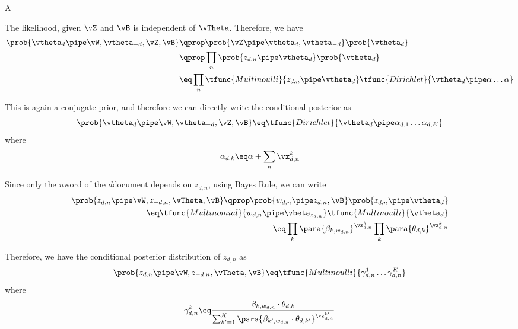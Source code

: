 \documentclass{article}
\begin{document}
\begin{question}
\begin{qpart}{A}
\begin{enumerate}
				The likelihood, given $\vZ$ and $\vB$ is independent of $\vTheta$. Therefore, we have
				\begin{align*}
					\prob{\vtheta_d \pipe \vW, \vtheta_{-d}, \vZ, \vB} &\qprop \prob{\vZ \pipe \vtheta_d, \vtheta_{-d}} \prob{\vtheta_d} \\
					&\qprop	\prod_{n} \prob{z_{d, n} \pipe \vtheta_d} \prob{\vtheta_d} \\
					&\eq	\prod_{n} \tfunc{Multinoulli}{z_{d, n} \pipe \vtheta_d} \tfunc{Dirichlet}{\vtheta_d \pipe \alpha \dots \alpha}
				\end{align*}

				This is again a conjugate prior, and therefore we can directly write the conditional posterior as
				\begin{equation}
					\prob{\vtheta_d \pipe \vW, \vtheta_{-d}, \vZ, \vB} \eq \tfunc{Dirichlet}{\vtheta_d \pipe \alpha_{d, 1} \dots \alpha_{d, K}}
				\end{equation}
				where
				\begin{align*}
					\alpha_{d, k} \eq \alpha + \sum_{n} \vz_{d, n}^{k}
				\end{align*}


				Since only the $n$\tth word of the $d$\tth document depends on $z_{d, n}$, using Bayes Rule, we can write
				\begin{align*}
					\prob{z_{d, n} \pipe \vW, z_{- d, n}, \vTheta, \vB} \qprop \prob{w_{d, n} \pipe z_{d, n}, \vB} \prob{z_{d, n} \pipe \vtheta_d} \\
					\eq \tfunc{Multinomial}{w_{d, n} \pipe \vbeta_{z_{d, n}}} \tfunc{Multinoulli}{\vtheta_d} \\
					\eq \prod_{k} \para{\beta_{k, w_{d, n}}}^{\vz_{d, n}^{k}} \prod_{k} \para{\theta_{d, k}}^{\vz_{d, n}^{k}}
				\end{align*}

				Therefore, we have the conditional posterior distribution of $z_{d, n}$ as
				\begin{equation}
					\prob{z_{d, n} \pipe \vW, z_{- d, n}, \vTheta, \vB}  \eq \tfunc{Multinoulli}{\gamma_{d, n}^1 \dots \gamma_{d, n}^K}
				\end{equation}
				where
				\begin{align*}
					\gamma_{d, n}^k \eq \frac{\beta_{k, w_{d, n}} \cdot \theta_{d, k}}{\sum_{k' = 1}^K \para{\beta_{k', w_{d, n}} \cdot \theta_{d, k'}}^{\vz_{d, n}^{k'}}}
				\end{align*}


\end{enumerate}
\end{qpart}
\end{question}
\end{document}
